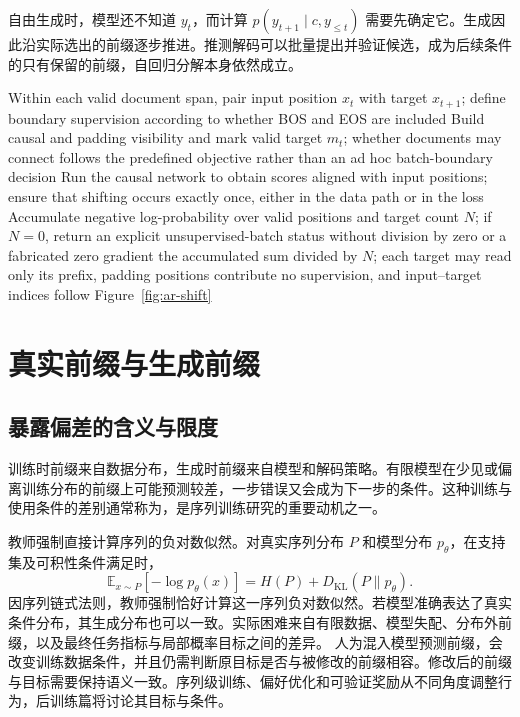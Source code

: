 \documentclass[../textbook.tex]{subfiles}
\begin{document}
自由生成时，模型还不知道 $y_t$，而计算 $p(y_{t+1}\mid c,y_{\leq t})$ 需要先确定它。生成因此沿实际选出的前缀逐步推进。推测解码可以批量提出并验证候选，成为后续条件的只有保留的前缀，自回归分解本身依然成立。

\begin{algorithm}[移位目标的教师强制损失]
\label{alg:ar-teacher}
\begin{myalgorithmic}[1]
 \State Within each valid document span, pair input position $x_t$ with target $x_{t+1}$; define boundary supervision according to whether BOS and EOS are included
 \State Build causal and padding visibility and mark valid target $m_t$; whether documents may connect follows the predefined objective rather than an ad hoc batch-boundary decision
 \State Run the causal network to obtain scores aligned with input positions; ensure that shifting occurs exactly once, either in the data path or in the loss
 \State Accumulate negative log-probability over valid positions and target count $N$; if $N=0$, return an explicit unsupervised-batch status without division by zero or a fabricated zero gradient
 \State \Return the accumulated sum divided by $N$; each target may read only its prefix, padding positions contribute no supervision, and input--target indices follow Figure~\ref{fig:ar-shift}
\end{myalgorithmic}
\end{algorithm}

\section{真实前缀与生成前缀}

\subsection{暴露偏差的含义与限度}
训练时前缀来自数据分布，生成时前缀来自模型和解码策略。有限模型在少见或偏离训练分布的前缀上可能预测较差，一步错误又会成为下一步的条件。这种训练与使用条件的差别通常称为，是序列训练研究的重要动机之一\cite{bengio2015scheduledsampling}。

教师强制直接计算序列的负对数似然。对真实序列分布 $P$ 和模型分布 $p_\theta$，在支持集及可积性条件满足时，
\begin{equation}
 \mathbb E_{x\sim P}[-\log p_\theta(x)]
 =H(P)+D_{\mathrm{KL}}(P\|p_\theta).
\end{equation}
因序列链式法则，教师强制恰好计算这一序列负对数似然。若模型准确表达了真实条件分布，其生成分布也可以一致。实际困难来自有限数据、模型失配、分布外前缀，以及最终任务指标与局部概率目标之间的差异。
人为混入模型预测前缀，会改变训练数据条件，并且仍需判断原目标是否与被修改的前缀相容。修改后的前缀与目标需要保持语义一致。序列级训练、偏好优化和可验证奖励从不同角度调整行为，后训练篇将讨论其目标与条件。
\end{document}
